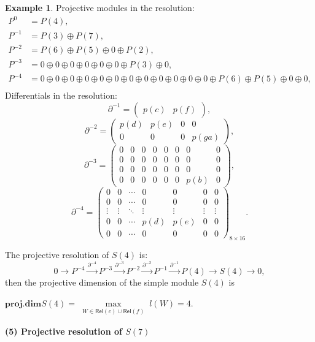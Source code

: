 \documentclass[11pt]{amsart}
\numberwithin{equation}{section}
\theoremstyle{definition}
\newtheorem{example}[theorem]{Example}
\begin{document}
\begin{example}
	Projective modules in the resolution: 
	\[
	\begin{aligned}
		P^0    &=  P(4), \\
		P^{-1} &=  P(3) \oplus P(7), \\
		P^{-2} &=  P(6) \oplus P(5) \oplus 0 \oplus P(2), \\ 
		P^{-3} &=  0 \oplus 0 \oplus 0 \oplus 0 \oplus 0 \oplus 0 \oplus P(3) \oplus 0,\\ 
		P^{-4} &=  0 \oplus 0 \oplus 0 \oplus 0 \oplus 0 \oplus 0 \oplus 0 \oplus 0 \oplus 0 \oplus 0 \oplus 0 \oplus 0 \oplus P(6) \oplus P(5) \oplus 0 \oplus 0,\\
	\end{aligned}
	\]
	 Differentials in the resolution:
	\[
	\partial^{-1} = \begin{pmatrix} p(c) & p(f) \end{pmatrix},
	\]
	\[
	\partial^{-2} = \begin{pmatrix} p(d) & p(e) & 0 & 0 \\ 0 & 0 & 0 & p(ga) \end{pmatrix},
	\]
	\[
	\partial^{-3} = \begin{pmatrix}0 & 0 & 0 & 0 & 0 & 0 & 0 & 0 \\ 0 & 0 & 0 & 0 & 0 & 0 & 0 & 0 \\ 0 & 0 & 0 & 0 & 0 & 0 & 0 & 0 \\ 0 & 0 & 0 & 0 & 0 & 0 & p(b) & 0 \end{pmatrix},
	\]
	\[
	\partial^{-4} = \begin{pmatrix} 0 & 0 & \cdots & 0 & 0 & 0 & 0 \\ 0 & 0 & \cdots & 0 & 0 & 0 & 0 \\ \vdots & \vdots & \ddots & \vdots & \vdots & \vdots & \vdots \\ 0 & 0 & \cdots & p(d) & p(e) & 0 & 0 \\ 0 & 0 & \cdots & 0 & 0 & 0 & 0 \end{pmatrix}_{8 \times 16}.
	\]
	
	\noindent The projective resolution of \( S(4) \) is:
	\[
	0 \to P^{-4} \xrightarrow{\partial^{-4}} P^{-3} \xrightarrow{\partial^{-3}} P^{-2} \xrightarrow{\partial^{-2}} P^{-1} \xrightarrow{\partial^{-1}} P(4) \to S(4) \to 0,
	\]
	then the projective dimension of the simple module \( S(4) \) is 
	\begin{center}
		\( \textbf{proj.dim}S(4) = \max\limits_{\substack{W \in \mathsf{Rel}(c) \cup \mathsf{Rel}(f)}} l(W) = 4 \).
	\end{center}
	\textbf{(5)  Projective resolution of \( S(7) \)}
	

\end{example}
\end{document}
